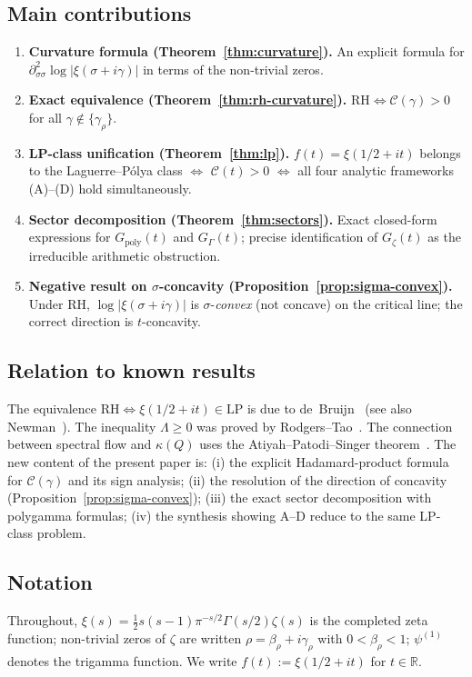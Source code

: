 \documentclass[11pt]{amsart}
\newcommand{\LP}{\mathrm{LP}}
\begin{document}
\subsection*{Main contributions}

\begin{enumerate}
  \item \textbf{Curvature formula (Theorem~\ref{thm:curvature}).} An explicit formula
    for $\partial^2_{\sigma\sigma}\log|\xi(\sigma+i\gamma)|$ in terms of the non-trivial zeros.
  \item \textbf{Exact equivalence (Theorem~\ref{thm:rh-curvature}).} $\mathrm{RH}
    \iff \mathcal{C}(\gamma) > 0$ for all $\gamma \notin \{\gamma_\rho\}$.
  \item \textbf{LP-class unification (Theorem~\ref{thm:lp}).} $f(t) = \xi(1/2+it)$
    belongs to the Laguerre--P\'olya class $\iff$ $\mathcal{C}(t) > 0$ $\iff$ all
    four analytic frameworks (A)--(D) hold simultaneously.
  \item \textbf{Sector decomposition (Theorem~\ref{thm:sectors}).} Exact closed-form
    expressions for $G_{\mathrm{poly}}(t)$ and $G_\Gamma(t)$; precise identification
    of $G_\zeta(t)$ as the irreducible arithmetic obstruction.
  \item \textbf{Negative result on $\sigma$-concavity (Proposition~\ref{prop:sigma-convex}).}
    Under RH, $\log|\xi(\sigma+i\gamma)|$ is $\sigma$-\emph{convex} (not concave) on the
    critical line; the correct direction is $t$-concavity.
\end{enumerate}

\subsection*{Relation to known results}

The equivalence $\mathrm{RH} \iff \xi(1/2+it) \in \LP$ is due to de~Bruijn~\cite{deBruijn1950}
(see also Newman~\cite{Newman1976}). The inequality $\Lambda \geq 0$ was proved by
Rodgers--Tao~\cite{RodgersTao2020}. The connection between spectral flow and $\kappa(Q)$
uses the Atiyah--Patodi--Singer theorem~\cite{APS1975}.
The new content of the present paper is:
(i) the explicit Hadamard-product formula for $\mathcal{C}(\gamma)$ and its sign analysis;
(ii) the resolution of the direction of concavity (Proposition~\ref{prop:sigma-convex});
(iii) the exact sector decomposition with polygamma formulas;
(iv) the synthesis showing A--D reduce to the same LP-class problem.

\subsection*{Notation}
Throughout, $\xi(s) = \frac{1}{2}s(s-1)\pi^{-s/2}\Gamma(s/2)\zeta(s)$ is the completed
zeta function; non-trivial zeros of $\zeta$ are written $\rho = \beta_\rho + i\gamma_\rho$
with $0 < \beta_\rho < 1$; $\psi^{(1)}$ denotes the trigamma function.
We write $f(t) := \xi(1/2+it)$ for $t \in \mathbb{R}$.
\end{document}
